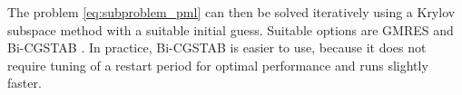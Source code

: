 \documentclass[11pt,a4paper]{article}
\theoremstyle{plain}%
\theoremstyle{definition}
\theoremstyle{remark}
\begin{document}
The problem \eqref{eq:subproblem_pml} can then be solved iteratively using a Krylov subspace method with a suitable initial guess. 
Suitable options are GMRES \cite{saad1986GMRES} and Bi-CGSTAB \cite{vanderVorst1992BiCGSTAB}. 
In practice, Bi-CGSTAB is easier to use, because it does not require tuning of a restart period for optimal performance and runs slightly faster.

\end{document}
